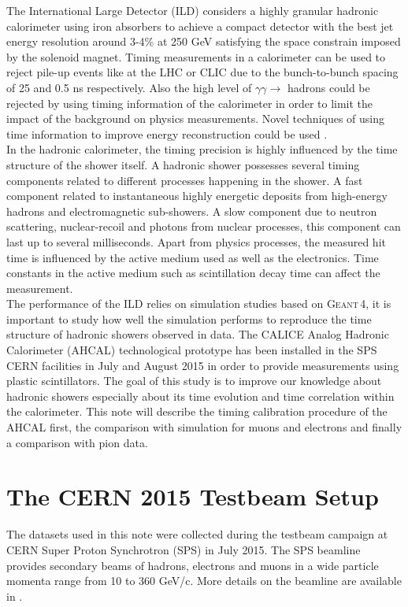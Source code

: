 \documentclass[twoside,a4paper,11pt]{article}
\newcommand\geant{\textsc{Geant\,4}\xspace}
\begin{document}
The International Large Detector (ILD) \cite{ILC_TDR} considers a highly granular hadronic calorimeter using iron absorbers to achieve a compact detector with the best jet energy resolution around 3-4\% at 250 GeV satisfying the space constrain imposed by the solenoid magnet. Timing measurements in a calorimeter can be used to reject pile-up events like at the LHC or CLIC due to the bunch-to-bunch spacing of 25 and 0.5 ns respectively. Also the high level of $\gamma\gamma \rightarrow$ hadrons could be rejected by using timing information of the calorimeter in order to limit the impact of the background on physics measurements. Novel techniques of using time information to improve energy reconstruction could be used \cite{IEEE_timing}.\\
In the hadronic calorimeter, the timing precision is highly influenced by the time structure of the shower itself. A hadronic shower possesses several timing components related to different processes happening in the shower. A fast component related to instantaneous highly energetic deposits from high-energy hadrons and electromagnetic sub-showers. A slow component due to neutron scattering, nuclear-recoil and photons from nuclear processes, this component can last up to several milliseconds. Apart from physics processes, the measured hit time is influenced by the active medium used as well as the electronics. Time constants in the active medium such as scintillation decay time can affect the measurement.\\
The performance of the ILD relies on simulation studies based on \geant, it is important to study how well the simulation performs to reproduce the time structure of hadronic showers observed in data. The CALICE Analog Hadronic Calorimeter (AHCAL) technological prototype has been installed in the SPS CERN facilities in July and August 2015 in order to provide measurements using plastic scintillators. The goal of this study is to improve our knowledge about hadronic showers especially about its time evolution and time correlation within the calorimeter. This note will describe the timing calibration procedure of the AHCAL first, the comparison with simulation for muons and electrons and finally a comparison with pion data.

\section{The CERN 2015 Testbeam Setup}

The datasets used in this note were collected during the testbeam campaign at CERN Super Proton Synchrotron (SPS) in July 2015. The SPS beamline provides secondary beams of hadrons, electrons and muons in a wide particle momenta range from 10 to 360 GeV/c. More details on the beamline are available in \cite{SPSBeamLine}.
\end{document}
